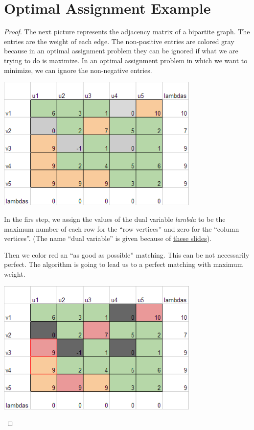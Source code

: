 ﻿\chapter{Optimal Assignment Example}

\begin{proof}
    The next picture represents the adjacency matrix of a bipartite graph.
    The entries are the weight of each edge. The non-positive entries
    are colored gray because in an optimal assignment problem they
    can be ignored if what we are trying to do is maximize. In an optimal
    assignment problem in which we want to minimize, we can ignore the
    non-negative entries.
    
    \begin{center}
        \includegraphics[width=10cm]{Homework2/OptimalAssignment1.png}    
    \end{center}\pn
    
    In the firs step, we assign the values of the dual variable \textit{lambda} 
    to be the maximum number of each row for the ``row vertices'' and zero
    for the ``column vertices''. (The name ``dual variable'' is given
    because of \href{http://www.mpi-inf.mpg.de/departments/d1/teaching/ss12/AdvancedGraphAlgorithms/Slides06.pdf}{these slides}).\pn
    
    Then we color red an ``as good as possible'' matching. This can be not necessarily perfect.
    The algorithm is going to lead us to a perfect matching with maximum weight.\pn 
    
    \begin{center}
        \includegraphics[width=10cm]{Homework2/OptimalAssignment2.png}        
    \end{center}\pn
    

\end{proof}
